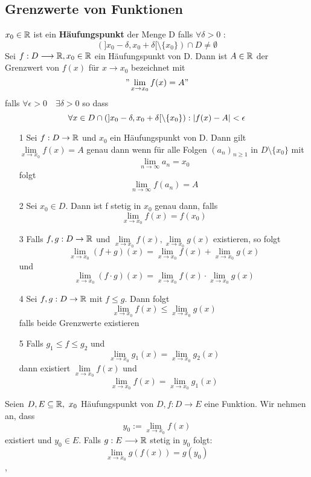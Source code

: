 \subsection{Grenzwerte von Funktionen}
\Def[3.47] \(x_0 \in \mathbb{R} \) ist ein \textbf{Häufungspunkt} der Menge D falls \( \forall \delta > 0\) : 
\[ (]x_0 - \delta, x_0 + \delta [ \setminus \{x_0\}) \cap D \neq \emptyset \]
\Def[3.49] Sei \( f: D \longrightarrow \mathbb{R}, x_0 \in \mathbb{R} \) ein Häufungspunkt von D. Dann ist \(A \in \mathbb{R} \) der Grenzwert von \(f(x)\) für \(x \rightarrow x_0\) bezeichnet mit
\["\lim\limits_{x \rightarrow x_0} f(x) = A"\]
falls \( \forall \epsilon > 0 \quad \exists \delta > 0\) so dass
\[ \forall x \in D \cap (] x_0 - \delta, x_0 + \delta [ \setminus \{x_0\}) : \left\lvert f(x) - A  \right\rvert < \epsilon\]
\begin{enumerate}
    \item [1] Sei \(f : D \rightarrow \mathbb{R} \) und \(x_0\) ein Häufungspunkt von D. Dann gilt \(\lim\limits_{x \rightarrow x_0} f(x) = A \) genau dann wenn für alle Folgen \((a_n)_{n \geq 1 }\) in \(D \setminus \{x_0\}\) mit
    \[ \lim\limits_{n \rightarrow \infty} a_n = x_0  \]
    folgt
    \[ \lim\limits_{n \rightarrow \infty} f(a_n) = A \]
    \item [2] Sei \(x_0 \in D. \) Dann ist f stetig in \(x_0\) genau dann, falls
    \[ \lim\limits_{x \rightarrow x_0} f(x) = f(x_0)\]
    \item [3] Falls \(f,g : D \rightarrow \mathbb{R} \) und \( \lim\limits_{x \rightarrow x_0} f(x), \lim\limits_{x \rightarrow x_0} g(x)\) existieren, so folgt
    \[\lim\limits_{x \rightarrow x_0}(f + g)(x) = \lim\limits_{x \rightarrow x_0} f(x) + \lim\limits_{x \rightarrow x_0} g(x)\]
    und
    \[\lim\limits_{x \rightarrow x_0}(f \cdot g)(x) = \lim\limits_{x \rightarrow x_0} f(x) \cdot \lim\limits_{x \rightarrow x_0} g(x)\]
    \item [4] Sei \(f,g : D \rightarrow \mathbb{R} \) mit \(f \leq g \). Dann folgt
    \[\lim\limits_{x \rightarrow x_0} f(x) \leq \lim\limits_{x \rightarrow x_0} g(x)\]
    falls beide Grenzwerte existieren
    \newline\newline
    \item [5] Falls \(g_1 \leq f \leq g_2\) und
    \[ \lim\limits_{x \rightarrow x_0} g_1(x) = \lim\limits_{x \rightarrow x_0} g_2(x)\]
    dann existiert \(\lim\limits_{x \rightarrow x_0} f(x)\) und
    \[ \lim\limits_{x \rightarrow x_0} f(x) = \lim\limits_{x \rightarrow x_0} g_1(x )\]
\end{enumerate}
\Satz[3.52] Seien \(D,E \subseteq \mathbb{R},\  x_0 \) Häufungspunkt von \(D, f: D \longrightarrow E \) eine Funktion. Wir nehmen an, dass
\[y_0 := \lim\limits_{x \rightarrow x_0} f(x)\]
existiert und \(y_0 \in E.\) Falls \(g: E \longrightarrow \mathbb{R} \) stetig in \(y_0\) folgt:
\[ \lim\limits_{x \rightarrow x_0} g(f(x)) = g(y_0)\]
\sep
